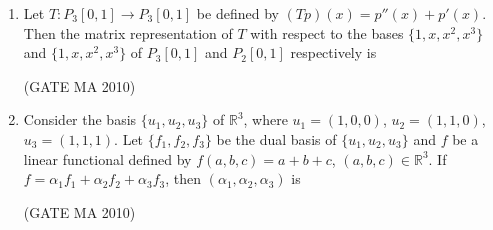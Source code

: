 \documentclass[journal,12pt,onecolumn]{IEEEtran}
\theoremstyle{remark}
\begin{document}
\begin{flushleft}
\begin{enumerate}
\begin{enumerate}

\end{enumerate}

\item Let $T:P_3[0,1]\to P_3[0,1]$ be defined by $(Tp)(x)=p''(x)+p'(x)$. Then the matrix representation of $T$ with respect to the bases $\{1,x,x^2,x^3\}$ and $\{1,x,x^2,x^3\}$ of $P_3[0,1]$ and $P_2[0,1]$ respectively is \underline{\hspace{2cm}}

\hfill(GATE MA 2010)

\begin{enumerate}
\end{enumerate}

\item Consider the basis $\{u_1,u_2,u_3\}$ of $\mathbb{R}^3$, where $u_1=(1,0,0)$, $u_2=(1,1,0)$, $u_3=(1,1,1)$. Let $\{f_1,f_2,f_3\}$ be the dual basis of $\{u_1,u_2,u_3\}$ and $f$ be a linear functional defined by $f(a,b,c)=a+b+c$, $(a,b,c)\in\mathbb{R}^3$. If $f=\alpha_1f_1+\alpha_2f_2+\alpha_3f_3$, then $(\alpha_1,\alpha_2,\alpha_3)$ is \underline{\hspace{2cm}}

\hfill(GATE MA 2010)

\begin{enumerate}
\end{enumerate}


\end{enumerate}
\end{flushleft}
\end{document}
